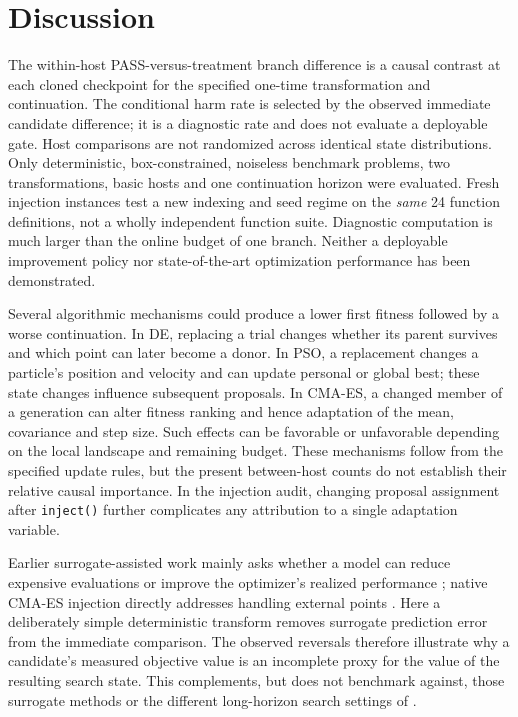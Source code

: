 \documentclass[10pt,letterpaper]{article}
\begin{document}
\section*{Discussion}
The within-host PASS-versus-treatment branch difference is a causal contrast at each cloned checkpoint for the specified one-time transformation and continuation. The conditional harm rate is selected by the observed immediate candidate difference; it is a diagnostic rate and does not evaluate a deployable gate. Host comparisons are not randomized across identical state distributions. Only deterministic, box-constrained, noiseless benchmark problems, two transformations, basic hosts and one continuation horizon were evaluated. Fresh injection instances test a new indexing and seed regime on the \emph{same} 24 function definitions, not a wholly independent function suite. Diagnostic computation is much larger than the online budget of one branch. Neither a deployable improvement policy nor state-of-the-art optimization performance has been demonstrated.

Several algorithmic mechanisms could produce a lower first fitness followed by a worse continuation. In DE, replacing a trial changes whether its parent survives and which point can later become a donor. In PSO, a replacement changes a particle's position and velocity and can update personal or global best; these state changes influence subsequent proposals. In CMA-ES, a changed member of a generation can alter fitness ranking and hence adaptation of the mean, covariance and step size. Such effects can be favorable or unfavorable depending on the local landscape and remaining budget. These mechanisms follow from the specified update rules, but the present between-host counts do not establish their relative causal importance. In the injection audit, changing proposal assignment after \texttt{inject()} further complicates any attribution to a single adaptation variable.

Earlier surrogate-assisted work mainly asks whether a model can reduce expensive evaluations or improve the optimizer's realized performance \cite{jin2011survey,blank2021psaf,gpsaf2022,hansen2019surrogate}; native CMA-ES injection directly addresses handling external points \cite{hansen2011inject}. Here a deliberately simple deterministic transform removes surrogate prediction error from the immediate comparison. The observed reversals therefore illustrate why a candidate's measured objective value is an incomplete proxy for the value of the resulting search state. This complements, but does not benchmark against, those surrogate methods or the different long-horizon search settings of \cite{siper2026}.
\end{document}
